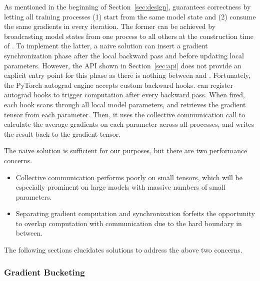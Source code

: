 As mentioned in the beginning of Section~\ref{sec:design},  guarantees correctness by letting all training processes (1) start from the same model state and (2) consume the same gradients in every iteration. The former can be achieved by broadcasting model states from one process to all others at the construction time of . To implement the latter, a naive solution can insert a gradient synchronization phase after the local backward pass and before updating local parameters. However, the API shown in Section~\ref{sec:api} does not provide an explicit entry point for this phase as there is nothing between  and . Fortunately, the PyTorch autograd engine accepts custom backward hooks.  can register autograd hooks to trigger computation after every backward pass. When fired, each hook scans through all local model parameters, and retrieves the gradient tensor from each parameter. Then, it uses the  collective communication call to calculate the average gradients on each parameter across all processes, and writes the result back to the gradient tensor.

The naive solution is sufficient for our purposes, but there are two performance concerns. 
\vspace{-0.3em}
\begin{itemize}
    \item Collective communication performs poorly on small tensors, which will be especially prominent on large models with massive numbers of small parameters. 
    \vspace{-0.3em}
    \item Separating gradient computation and synchronization forfeits the opportunity to overlap computation with communication due to the hard boundary in between.
\end{itemize}
The following sections elucidates solutions to address the above two concerns.


\subsubsection{Gradient Bucketing}

